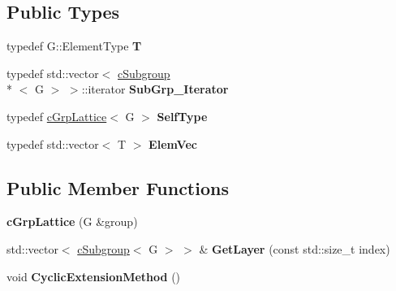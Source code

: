 \subsection*{Public Types}
\begin{DoxyCompactItemize}
\item 
\hypertarget{classcGrpLattice_adcd74a778419c1f515170d6f4eec0e46}{typedef G\-::\-Element\-Type {\bfseries T}}\label{classcGrpLattice_adcd74a778419c1f515170d6f4eec0e46}

\item 
\hypertarget{classcGrpLattice_a65bbb53481fb01fab29b56111e08a1a8}{typedef std\-::vector$<$ \hyperlink{classcSubgroup}{c\-Subgroup}\\*
$<$ G $>$ $>$\-::iterator {\bfseries Sub\-Grp\-\_\-\-Iterator}}\label{classcGrpLattice_a65bbb53481fb01fab29b56111e08a1a8}

\item 
\hypertarget{classcGrpLattice_a229b8231e9d4977673fcc629c083ed27}{typedef \hyperlink{classcGrpLattice}{c\-Grp\-Lattice}$<$ G $>$ {\bfseries Self\-Type}}\label{classcGrpLattice_a229b8231e9d4977673fcc629c083ed27}

\item 
\hypertarget{classcGrpLattice_ae5a1bef06325a01169039dfbbfcd279a}{typedef std\-::vector$<$ T $>$ {\bfseries Elem\-Vec}}\label{classcGrpLattice_ae5a1bef06325a01169039dfbbfcd279a}

\end{DoxyCompactItemize}
\subsection*{Public Member Functions}
\begin{DoxyCompactItemize}
\item 
\hypertarget{classcGrpLattice_a27f923e1817bed7d7d3b51a02d08bf76}{{\bfseries c\-Grp\-Lattice} (G \&group)}\label{classcGrpLattice_a27f923e1817bed7d7d3b51a02d08bf76}

\item 
\hypertarget{classcGrpLattice_a37b06de9e9bf5b647c524f000b054b6a}{std\-::vector$<$ \hyperlink{classcSubgroup}{c\-Subgroup}$<$ G $>$ $>$ \& {\bfseries Get\-Layer} (const std\-::size\-\_\-t index)}\label{classcGrpLattice_a37b06de9e9bf5b647c524f000b054b6a}

\item 
\hypertarget{classcGrpLattice_af05dbd664f73f60ea2e9bcef893da25b}{void {\bfseries Cyclic\-Extension\-Method} ()}\label{classcGrpLattice_af05dbd664f73f60ea2e9bcef893da25b}

\end{DoxyCompactItemize}
